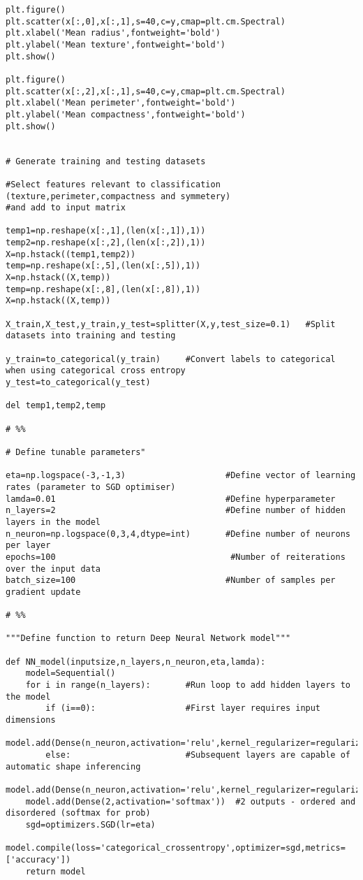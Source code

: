 \begin{verbatim}
plt.figure()
plt.scatter(x[:,0],x[:,1],s=40,c=y,cmap=plt.cm.Spectral)
plt.xlabel('Mean radius',fontweight='bold')
plt.ylabel('Mean texture',fontweight='bold')
plt.show()

plt.figure()
plt.scatter(x[:,2],x[:,1],s=40,c=y,cmap=plt.cm.Spectral)
plt.xlabel('Mean perimeter',fontweight='bold')
plt.ylabel('Mean compactness',fontweight='bold')
plt.show()


# Generate training and testing datasets

#Select features relevant to classification (texture,perimeter,compactness and symmetery) 
#and add to input matrix

temp1=np.reshape(x[:,1],(len(x[:,1]),1))
temp2=np.reshape(x[:,2],(len(x[:,2]),1))
X=np.hstack((temp1,temp2))      
temp=np.reshape(x[:,5],(len(x[:,5]),1))
X=np.hstack((X,temp))       
temp=np.reshape(x[:,8],(len(x[:,8]),1))
X=np.hstack((X,temp))       

X_train,X_test,y_train,y_test=splitter(X,y,test_size=0.1)   #Split datasets into training and testing

y_train=to_categorical(y_train)     #Convert labels to categorical when using categorical cross entropy
y_test=to_categorical(y_test)

del temp1,temp2,temp

# %%

# Define tunable parameters"

eta=np.logspace(-3,-1,3)                    #Define vector of learning rates (parameter to SGD optimiser)
lamda=0.01                                  #Define hyperparameter
n_layers=2                                  #Define number of hidden layers in the model
n_neuron=np.logspace(0,3,4,dtype=int)       #Define number of neurons per layer
epochs=100                                   #Number of reiterations over the input data
batch_size=100                              #Number of samples per gradient update

# %%

"""Define function to return Deep Neural Network model"""

def NN_model(inputsize,n_layers,n_neuron,eta,lamda):
    model=Sequential()      
    for i in range(n_layers):       #Run loop to add hidden layers to the model
        if (i==0):                  #First layer requires input dimensions
            model.add(Dense(n_neuron,activation='relu',kernel_regularizer=regularizers.l2(lamda),input_dim=inputsize))
        else:                       #Subsequent layers are capable of automatic shape inferencing
            model.add(Dense(n_neuron,activation='relu',kernel_regularizer=regularizers.l2(lamda)))
    model.add(Dense(2,activation='softmax'))  #2 outputs - ordered and disordered (softmax for prob)
    sgd=optimizers.SGD(lr=eta)
    model.compile(loss='categorical_crossentropy',optimizer=sgd,metrics=['accuracy'])
    return model


\end{verbatim}
